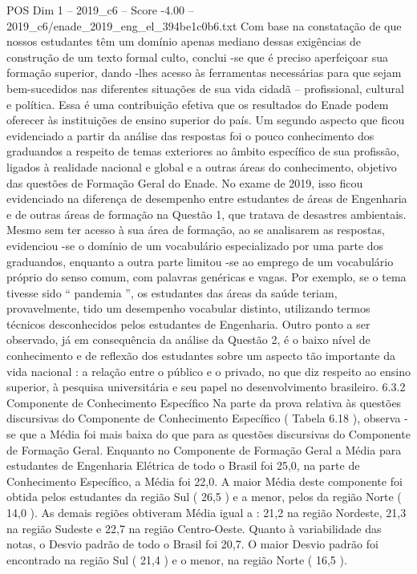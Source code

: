 \begin{textsample}{POS Dim 1 – 2019\_c6 – Score -4.00 – 2019\_c6/enade\_2019\_eng\_el\_394be1c0b6.txt}
Com base na constatação de que nossos estudantes têm um domínio apenas mediano dessas exigências de construção de um texto formal culto, conclui -se que é preciso aperfeiçoar sua formação superior, dando -lhes acesso às ferramentas necessárias para que sejam bem-sucedidos nas diferentes situações de sua vida cidadã – profissional, cultural e política.
Essa é uma contribuição efetiva que os resultados do Enade podem oferecer às instituições de ensino superior do país.
Um segundo aspecto que ficou evidenciado a partir da análise das respostas foi o pouco conhecimento dos graduandos a respeito de temas exteriores ao âmbito específico de sua profissão, ligados à realidade nacional e global e a outras áreas do conhecimento, objetivo das questões de Formação Geral do Enade.
No exame de 2019, isso ficou evidenciado na diferença de desempenho entre estudantes de áreas de Engenharia e de outras áreas de formação na Questão 1, que tratava de desastres ambientais.
Mesmo sem ter acesso à sua área de formação, ao se analisarem as respostas, evidenciou -se o domínio de um vocabulário especializado por uma parte dos graduandos, enquanto a outra parte limitou -se ao emprego de um vocabulário próprio do senso comum, com palavras genéricas e vagas.
Por exemplo, se o tema tivesse sido “ pandemia ”, os estudantes das áreas da saúde teriam, provavelmente, tido um desempenho vocabular distinto, utilizando termos técnicos desconhecidos pelos estudantes de Engenharia.
Outro ponto a ser observado, já em consequência da análise da Questão 2, é o baixo nível de conhecimento e de reflexão dos estudantes sobre um aspecto tão importante da vida nacional : a relação entre o público e o privado, no que diz respeito ao ensino superior, à pesquisa universitária e seu papel no desenvolvimento brasileiro. 6.3.2 Componente de Conhecimento Específico Na parte da prova relativa às questões discursivas do Componente de Conhecimento Específico ( Tabela 6.18 ), observa -se que a Média foi mais baixa do que para as questões discursivas do Componente de Formação Geral.
Enquanto no Componente de Formação Geral a Média para estudantes de Engenharia Elétrica de todo o Brasil foi 25,0, na parte de Conhecimento Específico, a Média foi 22,0.
A maior Média deste componente foi obtida pelos estudantes da região Sul ( 26,5 ) e a menor, pelos da região Norte ( 14,0 ).
As demais regiões obtiveram Média igual a : 21,2 na região Nordeste, 21,3 na região Sudeste e 22,7 na região Centro-Oeste.
Quanto à variabilidade das notas, o Desvio padrão de todo o Brasil foi 20,7.
O maior Desvio padrão foi encontrado na região Sul ( 21,4 ) e o menor, na região Norte ( 16,5 ).

\end{textsample}
